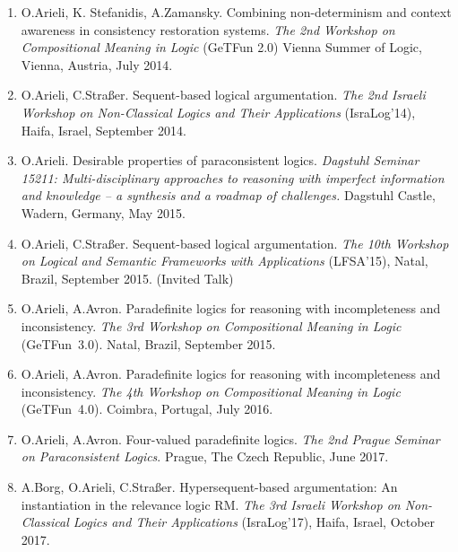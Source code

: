 \documentclass{article}
\begin{document}
\begin{enumerate}
   \item O.Arieli, K. Stefanidis, A.Zamansky.
         Combining non-determinism and context awareness in consistency restoration systems.
         {\em The 2nd Workshop on Compositional Meaning in Logic\/} (GeTFun 2.0)
         Vienna Summer of Logic, Vienna, Austria, July 2014.

   \item O.Arieli, C.Stra{\ss}er.
         Sequent-based logical argumentation.
         {\em The 2nd Israeli  Workshop on Non-Classical Logics and Their Applications\/}
         (IsraLog'14), Haifa, Israel, September 2014.

   \item O.Arieli.
         Desirable properties of paraconsistent logics.
         {\em Dagstuhl Seminar 15211: Multi-disciplinary approaches to reasoning with imperfect
         information and knowledge -- a synthesis and a roadmap of challenges.\/} Dagstuhl Castle,
         Wadern, Germany, May 2015.

   \item O.Arieli, C.Stra{\ss}er.
         Sequent-based logical argumentation.
         {\em The 10th Workshop on Logical and Semantic Frameworks with Applications\/} (LFSA'15),
         Natal, Brazil, September 2015. (Invited Talk)

   \item O.Arieli, A.Avron.
         Paradefinite logics for reasoning with incompleteness and inconsistency.
         {\em The 3rd Workshop on Compositional Meaning in Logic\/} (GeTFun~3.0).
         Natal, Brazil, September 2015.

   \item O.Arieli, A.Avron.
         Paradefinite logics for reasoning with incompleteness and inconsistency.
         {\em The 4th Workshop on Compositional Meaning in Logic\/} (GeTFun~4.0).
         Coimbra, Portugal, July 2016.

   \item O.Arieli, A.Avron.
         Four-valued paradefinite logics.
         {\em The 2nd Prague Seminar on Paraconsistent Logics\/}.
         Prague, The Czech Republic, June 2017.

  \item A.Borg, O.Arieli, C.Stra{\ss}er.
           Hypersequent-based argumentation: An instantiation in the relevance logic RM.
          {\em The 3rd Israeli  Workshop on Non-Classical Logics and Their Applications\/}
          (IsraLog'17), Haifa, Israel, October 2017.


\end{enumerate}
\end{document}
